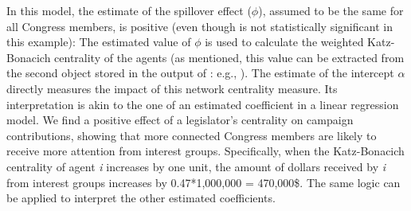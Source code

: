 \documentclass[nojss]{jss}
\begin{document}
In this model, the estimate of the spillover effect ($\phi$), assumed to be the same for all Congress members, is positive (even though is not statistically significant in this example): The estimated value of $\phi$ is used to calculate the weighted Katz-Bonacich centrality of the agents (as mentioned, this value can be extracted from the second object stored in the output of : e.g., ). The estimate of the intercept $\alpha$ directly measures the impact of this network centrality measure. Its interpretation is akin to the one of an estimated coefficient in a linear regression model. We find a positive effect of a legislator's centrality on campaign contributions, showing that more connected Congress members are likely to receive more attention from interest groups. Specifically, when the Katz-Bonacich centrality of agent \textit{i} increases by one unit, the amount of dollars received by \textit{i} from interest groups increases by 0.47*1,000,000 = 470,000\$. The same logic can be applied to interpret the other estimated coefficients.
\end{document}
